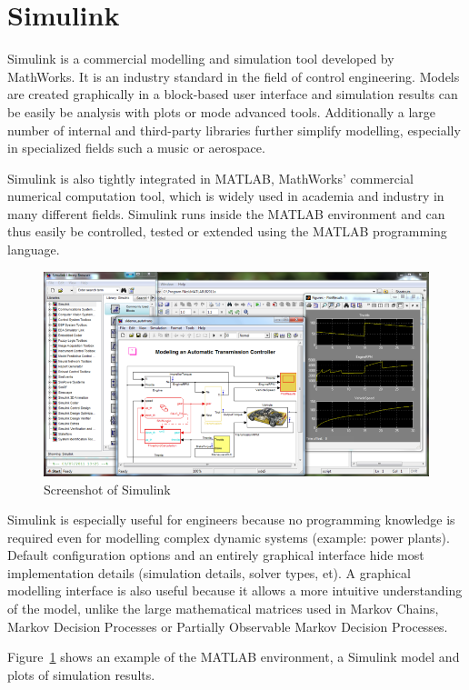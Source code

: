 \section{Simulink}

Simulink is a commercial modelling and simulation tool developed by MathWorks. It is an industry standard in the field of control engineering. Models are created graphically in a block-based user interface and simulation results can be easily be analysis with plots or mode advanced tools. Additionally a large number of internal and third-party libraries further simplify modelling, especially in specialized fields such a music or aerospace.

Simulink is also tightly integrated in MATLAB, MathWorks' commercial numerical computation tool, which is widely used in academia and industry in many different fields. Simulink runs inside the MATLAB environment and can thus easily be controlled, tested or extended using the MATLAB programming language.

\begin{figure}[simulink_screenshot]
\includegraphics[width=16cm]{media/simulink_screenshot.png}
\caption{Screenshot of Simulink}
\label{simulink_screenshot}
\end{figure}

Simulink is especially useful for engineers because no programming knowledge is required even for modelling complex dynamic systems (example: power plants). Default configuration options and an entirely graphical interface hide most implementation details (simulation details, solver types, et). A graphical modelling interface is also useful because it allows a more intuitive understanding of the model, unlike the large mathematical matrices used in Markov Chains, Markov Decision Processes or Partially Observable Markov Decision Processes.

Figure~\ref{simulink_screenshot} shows an example of the MATLAB environment, a Simulink model and plots of simulation results.
